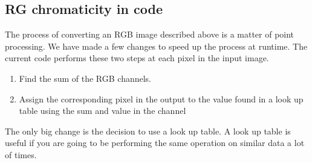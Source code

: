 \subsection{RG chromaticity in code}
The process of converting an RGB image described above is a matter of point processing. We have made a few changes to speed up the process at runtime. The current code performs these two steps at each pixel in the input image.\\
\begin{enumerate}
	\item Find the sum of the RGB channels.
	\item Assign the corresponding pixel in the output to the value found in a look up table using the sum and value in the channel\\
\end{enumerate}
The only big change is the decision to use a look up table. A look up table is useful if you are going to be performing the same operation on similar data a lot of times. 
